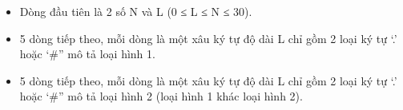 \begin{itemize}
	\item     Dòng đầu tiên là 2 số N và L (0 ≤ L ≤ N ≤ 30).   
	\item     5 dòng tiếp theo, mỗi dòng là một xâu ký tự độ dài L chỉ gồm 2 loại ký tự ‘.’ hoặc ‘\#” mô tả loại hình 1.   
	\item     5 dòng tiếp theo, mỗi dòng là một xâu ký tự độ dài L chỉ gồm 2 loại ký tự ‘.’ hoặc ‘\#” mô tả loại hình 2 (loại hình 1 khác loại hình 2).   
\end{itemize}